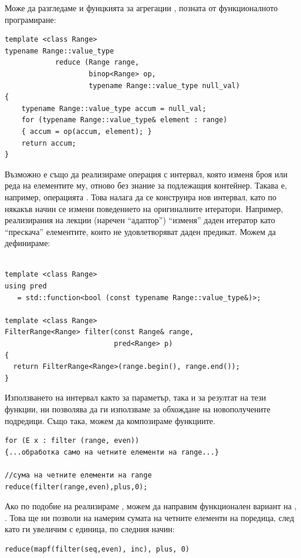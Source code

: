 \begin{mdframed}[hidealllines=true,backgroundcolor=gray!20]
  Може да разгледаме и фунцкията за агрегации , позната от функционалното програмиране: 
\begin{verbatim}
template <class Range>
typename Range::value_type 
            reduce (Range range,
                    binop<Range> op,
                    typename Range::value_type null_val)
{
    typename Range::value_type accum = null_val;
    for (typename Range::value_type& element : range)
    { accum = op(accum, element); }
    return accum;
}
\end{verbatim}
Възможно е също да реализираме операция с интервал, която изменя броя или реда на елементите му, отново без знание за подлежащия контейнер. Такава е, например, операцията . Това налага да се конструира нов интервал, като по някакъв начин се измени поведението на оригиналните итератори. Например, реализирания на лекции  (наречен ``адаптор'') ``изменя'' даден итератор като ``прескача'' елементите, които не удовлетворяват даден предикат. Можем да дефинираме:
\begin{verbatim}

template <class Range>
using pred 
   = std::function<bool (const typename Range::value_type&)>;

template <class Range>
FilterRange<Range> filter(const Range& range,
                          pred<Range> p)
{
  return FilterRange<Range>(range.begin(), range.end());
}    
\end{verbatim}

Използването на интервал както за параметър, така и за резултат на тези функции, ни позволява да ги използваме за обхождане на новополучените подредици. Също така, можем да композираме функциите.

\begin{verbatim}
for (E x : filter (range, even)) 
{...обработка само на четните елементи на range...}

//сума на четните елементи на range
reduce(filter(range,even),plus,0);

\end{verbatim}

Ако по подобие на  реализираме , можем да направим функционален вариант на , . Това ще ни позволи на намерим сумата на четните елементи на поредица, след като ги увеличим с единица, по следния начин:
\begin{verbatim}
reduce(mapf(filter(seq,even), inc), plus, 0)  
\end{verbatim}
\end{mdframed}

